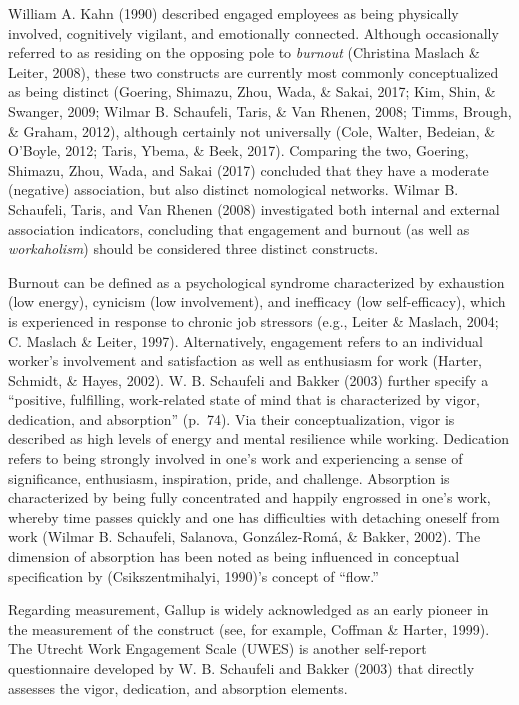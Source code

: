 \documentclass[
  english,
  man]{apa6}
\begin{document}
William A. Kahn (1990) described engaged employees as being physically involved, cognitively vigilant, and emotionally connected. Although occasionally referred to as residing on the opposing pole to \emph{burnout} (Christina Maslach \& Leiter, 2008), these two constructs are currently most commonly conceptualized as being distinct (Goering, Shimazu, Zhou, Wada, \& Sakai, 2017; Kim, Shin, \& Swanger, 2009; Wilmar B. Schaufeli, Taris, \& Van Rhenen, 2008; Timms, Brough, \& Graham, 2012), although certainly not universally (Cole, Walter, Bedeian, \& O'Boyle, 2012; Taris, Ybema, \& Beek, 2017). Comparing the two, Goering, Shimazu, Zhou, Wada, and Sakai (2017) concluded that they have a moderate (negative) association, but also distinct nomological networks. Wilmar B. Schaufeli, Taris, and Van Rhenen (2008) investigated both internal and external association indicators, concluding that engagement and burnout (as well as \emph{workaholism}) should be considered three distinct constructs.

Burnout can be defined as a psychological syndrome characterized by exhaustion (low energy), cynicism (low involvement), and inefficacy (low self-efficacy), which is experienced in response to chronic job stressors (e.g., Leiter \& Maslach, 2004; C. Maslach \& Leiter, 1997). Alternatively, engagement refers to an individual worker's involvement and satisfaction as well as enthusiasm for work (Harter, Schmidt, \& Hayes, 2002). W. B. Schaufeli and Bakker (2003) further specify a ``positive, fulfilling, work-related state of mind that is characterized by vigor, dedication, and absorption'' (p.~74). Via their conceptualization, vigor is described as high levels of energy and mental resilience while working. Dedication refers to being strongly involved in one's work and experiencing a sense of significance, enthusiasm, inspiration, pride, and challenge. Absorption is characterized by being fully concentrated and happily engrossed in one's work, whereby time passes quickly and one has difficulties with detaching oneself from work (Wilmar B. Schaufeli, Salanova, González-Romá, \& Bakker, 2002). The dimension of absorption has been noted as being influenced in conceptual specification by (Csikszentmihalyi, 1990)'s concept of ``flow.''

Regarding measurement, Gallup is widely acknowledged as an early pioneer in the measurement of the construct (see, for example, Coffman \& Harter, 1999). The Utrecht Work Engagement Scale (UWES) is another self-report questionnaire developed by W. B. Schaufeli and Bakker (2003) that directly assesses the vigor, dedication, and absorption elements.
\end{document}
